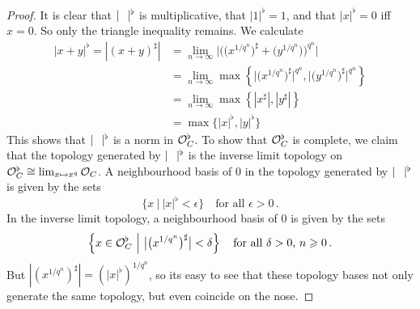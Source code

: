 \begin{proof}
	It is clear that $|\blank|^\flat$ is multiplicative, that $|1|^\flat=1$, and that $|x|^\flat=0$ iff $x=0$. So only the triangle inequality remains. We calculate
	\begin{align*}
		|x+y|^\flat=|(x+y)^\sharp|&=\lim_{n\to\infty}\bigg|\Big(\big(x^{1/q^n}\big)^\sharp+\big(y^{1/q^n}\big)\Big)^{q^n}\bigg|\\
		&=\lim_{n\to\infty}\max\left\{\big|\big(x^{1/q^n}\big)^\sharp\big|^{q^n},\big|\big(y^{1/q^n}\big)^\sharp\big|^{q^n}\right\}\\
		&=\lim_{n\to\infty}\max\left\{|x^\sharp|,|y^\sharp|\right\}\\
		&=\max\big\{|x|^\flat,|y|^\flat\big\}
	\end{align*}
	This shows that $|\blank|^\flat$ is a norm in $\mathcal{O}_C^\flat$. To show that $\mathcal{O}_C^\flat$ is complete, we claim that the topology generated by $|\blank|^\flat$ is the inverse limit topology on $\mathcal{O}_C^\flat\cong \operatorname*{lim}_{x\mapsto x^q}\mathcal{O}_C$. A neighbourhood basis of $0$ in the topology generated by $|\blank|^\flat$ is given by the sets
	\begin{equation*}
		\big\{x\ \big|\ |x|^\flat<\epsilon\big\}\quad\text{for all }\epsilon>0\,.
	\end{equation*}
	In the inverse limit topology, a neighbourhood basis of $0$ is given by the sets
	\begin{equation*}
		\left\{x\in \mathcal{O}_C^\flat\ \middle|\  \big|\big(x^{1/q^n}\big)^\sharp\big|<\delta\right\}\quad\text{for all }\delta>0\text{, }n\geqslant 0\,.
	\end{equation*}
	But $|(x^{1/q^n})^\sharp|=(|x|^\flat)^{1/q^n}$, so its easy to see that these topology bases not only generate the same topology, but even coincide on the nose.
	

\end{proof}
